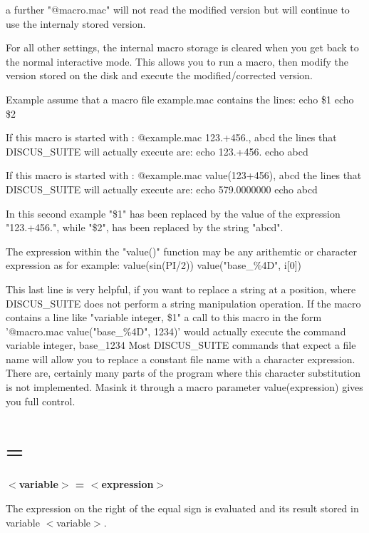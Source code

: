 a further "@macro.mac" will not read the modified version but will 
continue to use the internaly stored version. 
\par
For all other settings, the internal macro storage is 
cleared when you get back to the normal interactive mode. This allows 
you to run a macro, then modify the version stored on the disk and 
execute the modified/corrected version. 
\par
Example 
assume that a macro file example.mac contains the lines: 
echo \$1 
echo \$2 
\par
If this macro is started with : 
@example.mac 123.+456., abcd 
the lines that DISCUS\_SUITE will actually execute are: 
echo 123.+456. 
echo abcd 
\par
If this macro is started with : 
@example.mac value(123+456), abcd 
the lines that DISCUS\_SUITE will actually execute are: 
echo  579.0000000 
echo abcd 
\par
In this second example "\$1" has been replaced by the value 
of the expression "123.+456.", while "\$2", has been replaced 
by the string "abcd". 
\par
The expression within the "value()" function may be any 
arithemtic or character expression as for example: 
value(sin(PI/2)) 
value("base\_\%4D", i[0]) 
\par
This last line is very helpful, if you want to replace a 
string at a position, where DISCUS\_SUITE does not perform 
a string manipulation operation. If the macro contains a 
line like "variable integer, \$1" a call to this macro 
in the form '@macro.mac value("base\_\%4D", 1234)' 
would actually execute the command 
variable integer, base\_1234 
Most DISCUS\_SUITE commands that expect a file name will 
allow you to replace a constant file name with a 
character expression. There are, certainly many parts 
of the program where this character substitution is not 
implemented. Masink it through a macro parameter 
value(expression) gives you full control. 
\section{=}
{\bf $ <$variable$> $ = $ <$expression$> $ \par }
\par
\vspace{3pt}
The expression on the right of the equal sign is evaluated and its result 
stored in variable $ <$variable$> $. 
